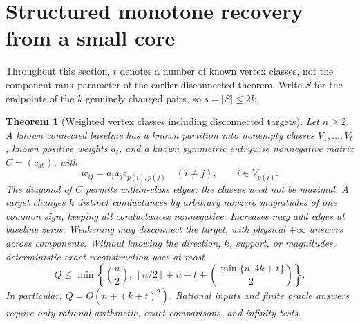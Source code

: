 \documentclass[11pt,letterpaper]{article}
\newtheorem{theorem}{Theorem}
\newcommand{\floor}[1]{\left\lfloor #1\right\rfloor}
\begin{document}
\section{Structured monotone recovery from a small core}
Throughout this section, $t$ denotes a number of known vertex classes, not the component-rank parameter of the earlier disconnected theorem. Write $S$ for the endpoints of the $k$ genuinely changed pairs, so $s=|S|\le2k$.

\begin{theorem}[Weighted vertex classes including disconnected targets]\label{thm:blowup}
Let $n\ge2$. A known connected baseline has a known partition into nonempty classes $V_1,\ldots,V_t$, known positive weights $a_i$, and a known symmetric entrywise nonnegative matrix $C=(c_{ab})$, with
\[
 w_{ij}=a_i a_j c_{p(i),p(j)}\quad(i\ne j),\qquad i\in V_{p(i)}.
\]
The diagonal of $C$ permits within-class edges; the classes need not be maximal. A target changes $k$ distinct conductances by arbitrary nonzero magnitudes of one common sign, keeping all conductances nonnegative. Increases may add edges at baseline zeros. Weakening may disconnect the target, with physical $+\infty$ answers across components. Without knowing the direction, $k$, support, or magnitudes, deterministic exact reconstruction uses at most
\[
 Q\le\min\left\{\binom n2,\ \floor{n/2}+n-t+
 \binom{\min\{n,4k+t\}}2\right\}.
\]
In particular, $Q=O(n+(k+t)^2)$. Rational inputs and finite oracle answers require only rational arithmetic, exact comparisons, and infinity tests.
\end{theorem}
\end{document}
